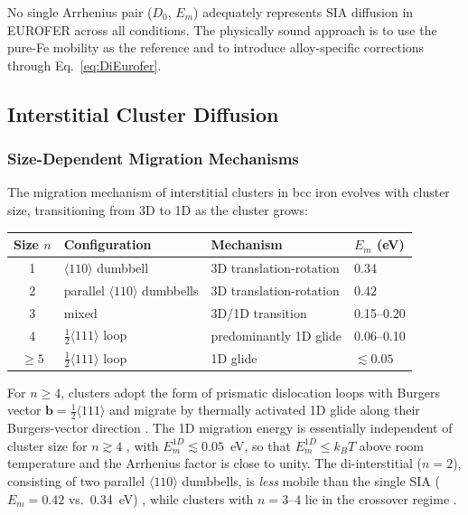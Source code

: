 \documentclass[pdflatex,sn-basic]{sn-jnl} %
\begin{document}
No single Arrhenius pair ($D_0$, $E_m$) adequately represents SIA diffusion in EUROFER across all conditions. The physically sound approach is to use the pure-Fe mobility as the reference and to introduce alloy-specific corrections through Eq.~\eqref{eq:DiEurofer}.
\subsection{Interstitial Cluster Diffusion}
\label{sec:SIA_cluster}

\subsubsection{Size-Dependent Migration Mechanisms}

The migration mechanism of interstitial clusters in bcc iron evolves with cluster size, transitioning from 3D to 1D as the cluster grows:

\begin{center}
\begin{tabular}{clll}
\toprule
Size $n$ & Configuration & Mechanism & $E_m$ (eV) \\
\midrule
1 & $\langle110\rangle$ dumbbell & 3D translation-rotation & 0.34 \\
2 & parallel $\langle110\rangle$ dumbbells & 3D translation-rotation & 0.42 \\
3 & mixed & 3D/1D transition & 0.15--0.20 \\
4 & $\frac{1}{2}\langle111\rangle$ loop & predominantly 1D glide & 0.06--0.10 \\
$\geq 5$ & $\frac{1}{2}\langle111\rangle$ loop & 1D glide & $\lesssim 0.05$ \\
\bottomrule
\end{tabular}
\end{center}

For $n \geq 4$, clusters adopt the form of prismatic dislocation loops with Burgers vector $\mathbf{b} = \frac{1}{2}\langle111\rangle$ and migrate by thermally activated 1D glide along their Burgers-vector direction \citep{Osetsky2003, Arakawa2007, Arakawa2016}. The 1D migration energy is essentially independent of cluster size for $n \gtrsim 4$ \citep{Osetsky2003}, with $E_m^{1D} \lesssim 0.05$~eV, so that $E_m^{1D} \leq k_B T$ above room temperature and the Arrhenius factor is close to unity. The di-interstitial ($n=2$), consisting of two parallel $\langle110\rangle$ dumbbells, is \emph{less} mobile than the single SIA ($E_m = 0.42$ vs.\ 0.34~eV) \citep{Fu2004}, while clusters with $n = 3$--$4$ lie in the crossover regime \citep{Terentyev2007}.
\end{document}
